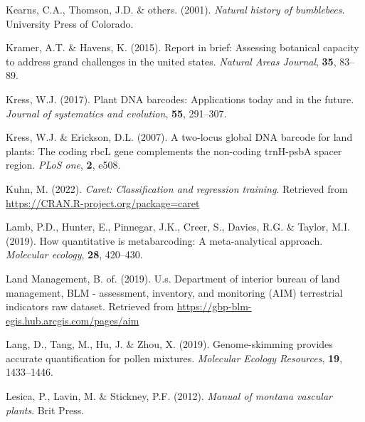 \documentclass[
]{article}
\newlength{\cslhangindent}
\newlength{\cslentryspacingunit} %
\newenvironment{CSLReferences}[2] %
 {%
  \setlength{\parindent}{0pt}
  \ifodd #1
  \let\oldpar\par
  \def\par{\hangindent=\cslhangindent\oldpar}
  \fi
  \setlength{\parskip}{#2\cslentryspacingunit}
 }%
 {}
\begin{document}
\begin{CSLReferences}{1}{0}
\leavevmode{}%
Kearns, C.A., Thomson, J.D. \& others. (2001). \emph{Natural history of
bumblebees}. University Press of Colorado.

\leavevmode{}%
Kramer, A.T. \& Havens, K. (2015). Report in brief: Assessing botanical
capacity to address grand challenges in the united states. \emph{Natural
Areas Journal}, \textbf{35}, 83--89.

\leavevmode{}%
Kress, W.J. (2017). Plant DNA barcodes: Applications today and in the
future. \emph{Journal of systematics and evolution}, \textbf{55},
291--307.

\leavevmode{}%
Kress, W.J. \& Erickson, D.L. (2007). A two-locus global DNA barcode for
land plants: The coding rbcL gene complements the non-coding trnH-psbA
spacer region. \emph{PLoS one}, \textbf{2}, e508.

\leavevmode{}%
Kuhn, M. (2022). \emph{Caret: Classification and regression training}.
Retrieved from \url{https://CRAN.R-project.org/package=caret}

\leavevmode{}%
Lamb, P.D., Hunter, E., Pinnegar, J.K., Creer, S., Davies, R.G. \&
Taylor, M.I. (2019). How quantitative is metabarcoding: A
meta-analytical approach. \emph{Molecular ecology}, \textbf{28},
420--430.

\leavevmode{}%
Land Management, B. of. (2019). U.s. Department of interior bureau of
land management, BLM - assessment, inventory, and monitoring (AIM)
terrestrial indicators raw dataset. Retrieved from
\url{https://gbp-blm-egis.hub.arcgis.com/pages/aim}

\leavevmode{}%
Lang, D., Tang, M., Hu, J. \& Zhou, X. (2019). Genome-skimming provides
accurate quantification for pollen mixtures. \emph{Molecular Ecology
Resources}, \textbf{19}, 1433--1446.

\leavevmode{}%
Lesica, P., Lavin, M. \& Stickney, P.F. (2012). \emph{Manual of montana
vascular plants}. Brit Press.


\end{CSLReferences}
\end{document}
